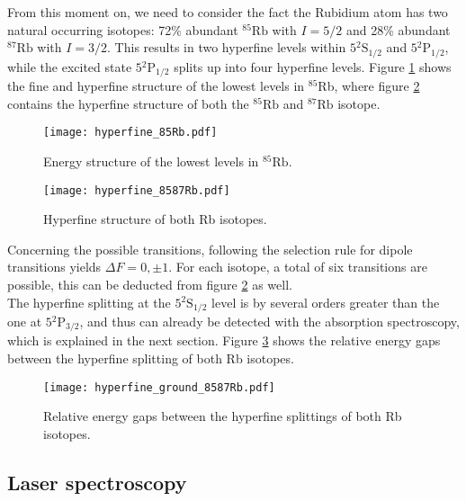 From this moment on, we need to consider the fact the Rubidium atom has two natural occurring  isotopes: 72\% abundant $^{85}\text{Rb}$ with $I=5/2$ and 28\% abundant $^{87}\text{Rb}$ with $I=3/2$. This results in two hyperfine levels within $5{}^2\mathrm{S}_{1/2}$ and $5{}^2\mathrm{P}_{1/2}$, while the excited state $5{}^2\mathrm{P}_{1/2}$ splits up into four hyperfine levels.
Figure \ref{fig:hyperfine_85Rb} shows the fine and hyperfine structure of the lowest levels in $^{85}$Rb, where figure \ref{fig:hyperfine_8587Rb} contains the hyperfine structure of both the $^{85}\text{Rb}$ and $^{87}\text{Rb}$ isotope.
\begin{figure}[h]
	\centering
	\texttt{[image: hyperfine\_85Rb.pdf]}
	\caption{Energy structure of the lowest levels in $^{85}\text{Rb}$. \cite{lit:SAS}}
	\label{fig:hyperfine_85Rb}
\end{figure}
\begin{figure}[h]
	\centering
	\texttt{[image: hyperfine\_8587Rb.pdf]}
	\caption{Hyperfine structure of both Rb isotopes. \cite{lit:AK_manual2012}}
	\label{fig:hyperfine_8587Rb}
\end{figure}
Concerning the possible transitions, following the selection rule for dipole transitions yields $\Delta F=0,\pm 1$. For each isotope, a total of six transitions are possible, this can be deducted from figure \ref{fig:hyperfine_8587Rb} as well.\\
The hyperfine splitting at the $5{}^2\mathrm{S}_{1/2}$ level is by several orders greater than the one at $5{}^2\mathrm{P}_{3/2}$, and thus can already be detected with the absorption spectroscopy, which is explained in the next section. Figure \ref{fig:hyperfine_ground_8587Rb} shows the relative energy gaps between the hyperfine splitting of both Rb isotopes.
\begin{figure}[h]
	\centering
	\texttt{[image: hyperfine\_ground\_8587Rb.pdf]}
	\caption[Energy gaps in hyperfine structure]{Relative energy gaps between the hyperfine splittings of both Rb isotopes. \cite{lit:AK_manual2012}}
	\label{fig:hyperfine_ground_8587Rb}
\end{figure}

\newpage
\subsection{Laser spectroscopy}
